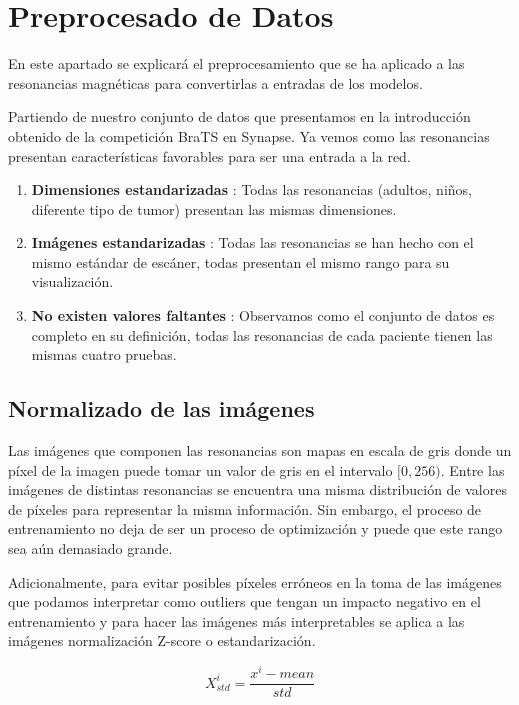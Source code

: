 \section{Preprocesado de Datos}

En este apartado se explicará el preprocesamiento que se ha aplicado a las resonancias magnéticas para convertirlas a entradas de los modelos. 

Partiendo de nuestro conjunto de datos que presentamos en la introducción obtenido de la competición BraTS en Synapse. Ya vemos como las resonancias presentan características favorables para ser una entrada a la red.

\begin{enumerate}
	\item \textbf{Dimensiones estandarizadas} : Todas las resonancias (adultos, niños, diferente tipo de tumor) presentan las mismas dimensiones.
	\item \textbf{Imágenes estandarizadas} : Todas las resonancias se han hecho con el mismo estándar de escáner, todas presentan el mismo rango para su visualización. 
	\item \textbf{No existen valores faltantes} : Observamos como el conjunto de datos es completo en su definición, todas las resonancias de cada paciente tienen las mismas cuatro pruebas.
\end{enumerate}

\subsection{Normalizado de las imágenes}

Las imágenes que componen las resonancias son mapas en escala de gris donde un píxel de la imagen puede tomar un valor de gris en el intervalo $[0, 256)$. Entre las imágenes de distintas resonancias se encuentra una misma distribución de valores de píxeles para representar la misma información. Sin embargo, el proceso de entrenamiento no deja de ser un proceso de optimización y puede que este rango sea aún demasiado grande.

Adicionalmente, para evitar posibles píxeles erróneos en la toma de las imágenes que podamos interpretar como outliers que tengan un impacto negativo en el entrenamiento y para hacer las imágenes más interpretables se aplica a las imágenes normalización Z-score o estandarización.

$$ X_{std}^{i}= \frac{x^{i}-mean}{std} $$



